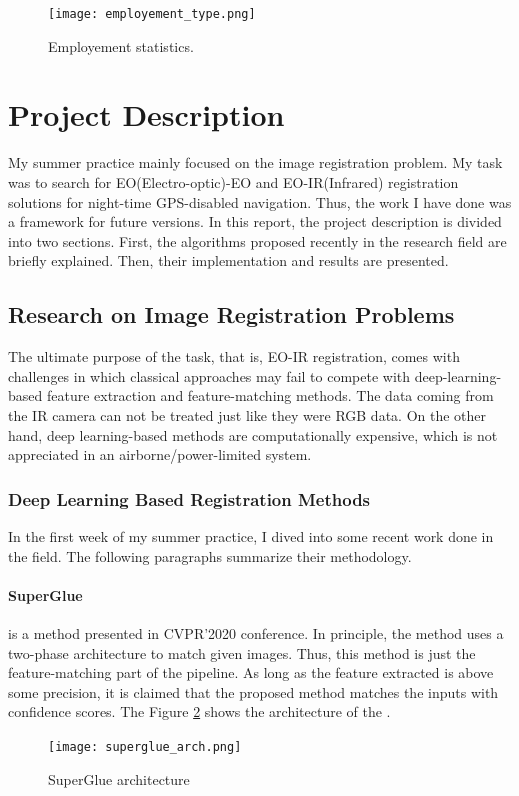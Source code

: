 \documentclass[letterpaper,12pt]{article}
\begin{document}
\begin{figure}[H]
    \centering
    \texttt{[image: employement\_type.png]}
    \caption{Employement statistics.}
    \label{esen_stat}
\end{figure} 
\section{Project Description}
My summer practice mainly focused on the image registration problem.  My task was to search for EO(Electro-optic)-EO and EO-IR(Infrared) registration solutions for night-time GPS-disabled navigation. Thus, the work I have done was a framework for future versions. In this report, the project description is divided into two sections. First, the algorithms proposed recently in the research field are briefly explained. Then, their implementation and results are presented.  
\subsection{Research on Image Registration Problems}
The ultimate purpose of the task, that is, EO-IR registration, comes with challenges in which classical approaches may fail to compete with deep-learning-based feature extraction and feature-matching methods. The data coming from the IR camera can not be treated just like they were RGB data. On the other hand, deep learning-based methods are computationally expensive, which is not appreciated in an airborne/power-limited system. 
\subsubsection{Deep Learning Based Registration Methods}
In the first week of my summer practice, I dived into some recent work done in the field. The following paragraphs summarize their methodology.
\paragraph{SuperGlue}
\cite{sarlin20superglue} is a method presented in CVPR'2020 conference. In principle, the method uses a two-phase architecture to match given images. Thus, this method is just the feature-matching part of the pipeline. As long as the feature extracted is above some precision, it is claimed that the proposed method matches the inputs with confidence scores. The Figure \ref*{superglue} shows the architecture of the \cite{sarlin20superglue}.

\begin{figure}[H]
    \centering
    \texttt{[image: superglue\_arch.png]}
    \caption{SuperGlue architecture}
    \label{superglue}
\end{figure} 
\end{document}
